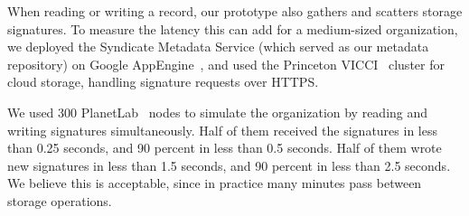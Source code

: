 When reading or writing a record, our prototype also gathers and scatters storage signatures.  To measure the latency this can add for a medium-sized organization, we deployed the Syndicate Metadata Service (which served as our metadata repository) on Google AppEngine~\cite{google-appengine}, and used the Princeton VICCI~\cite{VICCI} cluster for cloud storage, handling signature requests over HTTPS.

We used 300 PlanetLab~\cite{PlanetLab} nodes to simulate the organization by reading and writing signatures simultaneously.  Half of them received the signatures in less than 0.25 seconds, and 90 percent in less than 0.5 seconds.  Half of them wrote new signatures in less than 1.5 seconds, and 90 percent in less than 2.5 seconds.  We believe this is acceptable, since in practice many minutes pass between storage operations.